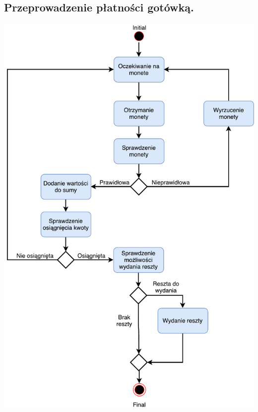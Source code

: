 \documentclass[11pt]{article}
\begin{document}
		\subsection{Przeprowadzenie płatności gotówką.}
		\begin{center}
			\includegraphics[scale=0.8]{czynnosci4.pdf}
		\end{center}
		\newpage
\end{document}
